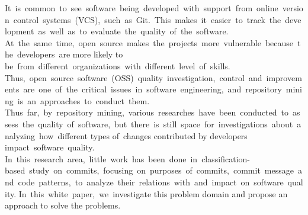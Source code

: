 It is common to see software being developed with support from online version control systems (VCS), such as Git. This makes it easier to track the development as well as to evaluate the quality of the software.
At the same time, open source makes the projects more vulnerable because the developers are more likely to be from different organizations with different level of skills.
Thus, open source software (OSS) quality investigation, control and improvements are one of the critical issues in software engineering, and repository mining is an approaches to conduct them.
Thus far, by repository mining, various researches have been conducted to assess the quality of software, but there is still space for investigations about analyzing how different types of changes contributed by developers impact software quality.
In this research area, little work has been done in classification-based study on commits, focusing on purposes of commits, commit message and code patterns, to analyze their relations with and impact on software quality.
In this white paper, we investigate this problem domain and propose an approach to solve the problems.